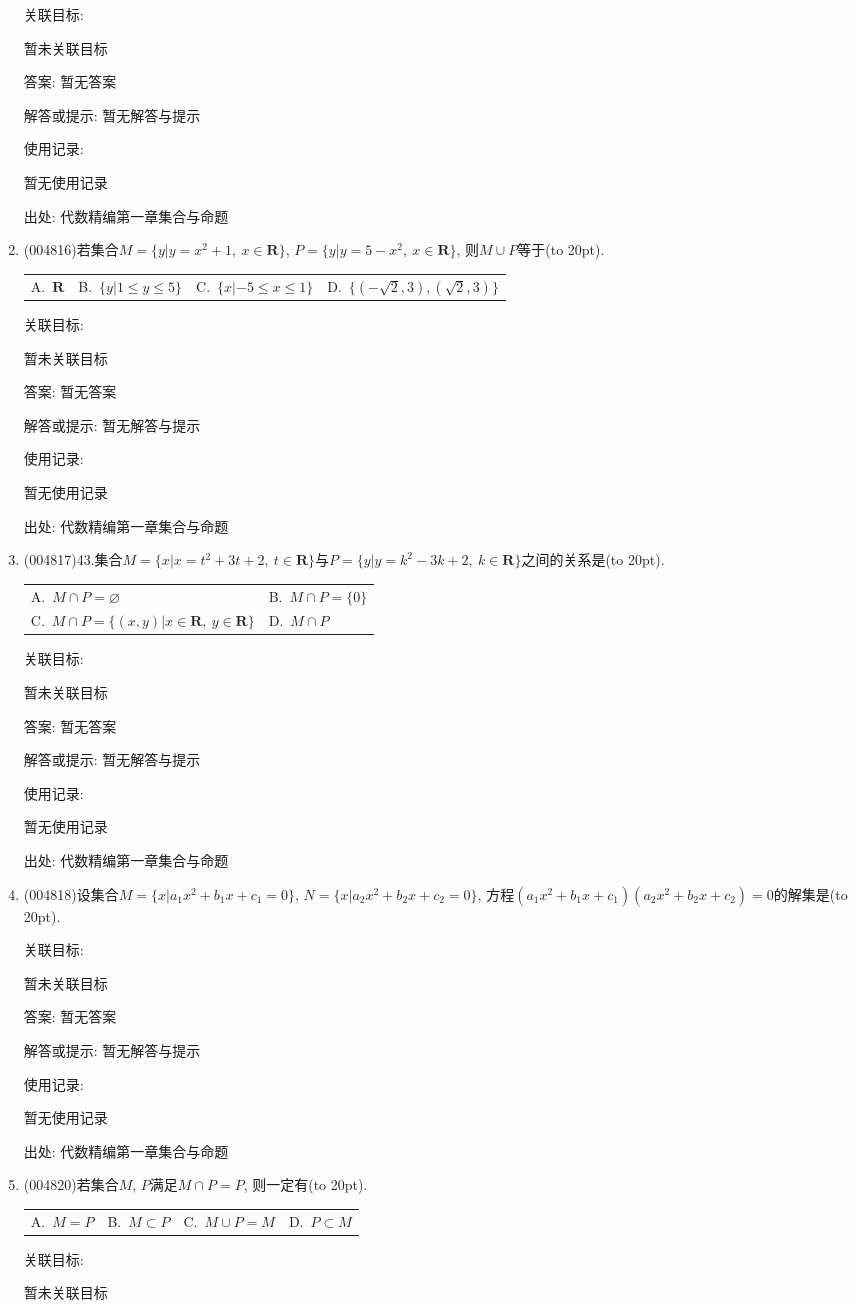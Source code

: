 \documentclass[10pt,a4paper]{article}
\newcommand{\bracket}[1]{(\hbox to #1pt{})}
\newcommand{\twoch}[4]{\par\begin{tabular}{p{.46\textwidth}p{.46\textwidth}}
A.~#1& B.~#2\\
C.~#3& D.~#4
\end{tabular}}
\newcommand{\fourch}[4]{\par\begin{tabular}{p{.23\textwidth}p{.23\textwidth}p{.23\textwidth}p{.23\textwidth}}
A.~#1 &B.~#2& C.~#3& D.~#4
\end{tabular}}
\begin{document}
\begin{enumerate}[1.]
关联目标:

暂未关联目标

答案: 暂无答案

解答或提示: 暂无解答与提示

使用记录:

暂无使用记录


出处: 代数精编第一章集合与命题
\item { (004816)}若集合$M=\{y|y=x^2+1, \ x\in \mathbf{R}\}$, $P=\{y|y=5-x^2, \ x\in \mathbf{R}\}$, 则$M\cup P$等于\bracket{20}.
\fourch{$\mathbf{R}$}{$\{y|1\le y\le 5\}$}{$\{x|-5\le x\le 1\}$}{$\{(-\sqrt 2,3),(\sqrt 2,3)\}$}


关联目标:

暂未关联目标

答案: 暂无答案

解答或提示: 暂无解答与提示

使用记录:

暂无使用记录


出处: 代数精编第一章集合与命题
\item { (004817)}43.集合$M=\{x |x=t^2+3t+2,\ t\in \mathbf{R}\}$与$P=\{y |y=k^2-3k+2,\ k\in \mathbf{R}\}$之间的关系是\bracket{20}.
\twoch{$M\cap P=\varnothing$}{$M\cap P=\{ 0\}$}{$M\cap P=\{(x,y)|x \in \mathbf{R}, \ y  \in \mathbf{R}\}$}{$M\cap P$}


关联目标:

暂未关联目标

答案: 暂无答案

解答或提示: 暂无解答与提示

使用记录:

暂无使用记录


出处: 代数精编第一章集合与命题
\item { (004818)}设集合$M=\{x|a_1x^2+b_1x+c_1=0\}$, $N=\{x|a_2x^2+b_2x+c_2=0\}$, 方程$(a_1x^2+b_1x+c_1)(a_2x^2+b_2x+c_2)=0$的解集是\bracket{20}.


关联目标:

暂未关联目标

答案: 暂无答案

解答或提示: 暂无解答与提示

使用记录:

暂无使用记录


出处: 代数精编第一章集合与命题
\item { (004820)}若集合$M$, $P$满足$M\cap P=P$, 则一定有\bracket{20}.
\fourch{$M=P$}{$M\subset P$}{$M\cup P=M$}{$P\subset M$}


关联目标:

暂未关联目标


\end{enumerate}
\end{document}
